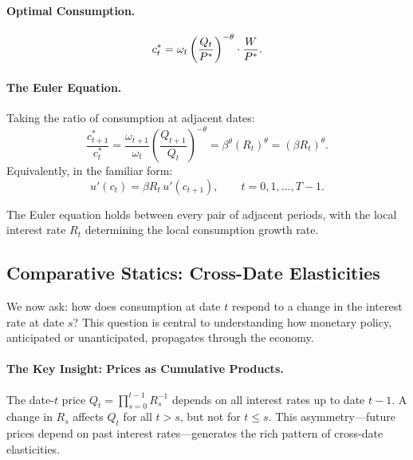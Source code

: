 \paragraph{Optimal Consumption.}
\begin{equation}
c_t^* = \omega_t \left( \frac{Q_t}{P^{*}} \right)^{-\theta} \cdot \frac{W}{P^{*}}.
\label{eq:consumption-T}
\end{equation}

\paragraph{The Euler Equation.}
Taking the ratio of consumption at adjacent dates:
\begin{equation}
\frac{c_{t+1}^*}{c_t^*} = \frac{\omega_{t+1}}{\omega_t} \left( \frac{Q_{t+1}}{Q_t} \right)^{-\theta} = \beta^{\theta} \left( R_t \right)^{\theta} = (\beta R_t)^{\theta}.
\label{eq:euler-T}
\end{equation}
Equivalently, in the familiar form:
\begin{equation}
u'(c_t) = \beta R_t \, u'(c_{t+1}), \qquad t = 0, 1, \ldots, T-1.
\label{eq:euler-T-standard}
\end{equation}

The Euler equation holds between every pair of adjacent periods, with the local interest rate $R_t$ determining the local consumption growth rate.

\subsection{Comparative Statics: Cross-Date Elasticities}
\label{subsec:T-comparative-statics}

We now ask: how does consumption at date $t$ respond to a change in the interest rate at date $s$? This question is central to understanding how monetary policy, anticipated or unanticipated, propagates through the economy.

\paragraph{The Key Insight: Prices as Cumulative Products.}
The date-$t$ price $Q_t = \prod_{s=0}^{t-1} R_s^{-1}$ depends on all interest rates up to date $t-1$. A change in $R_s$ affects $Q_t$ for all $t > s$, but not for $t \leq s$. This asymmetry---future prices depend on past interest rates---generates the rich pattern of cross-date elasticities.

